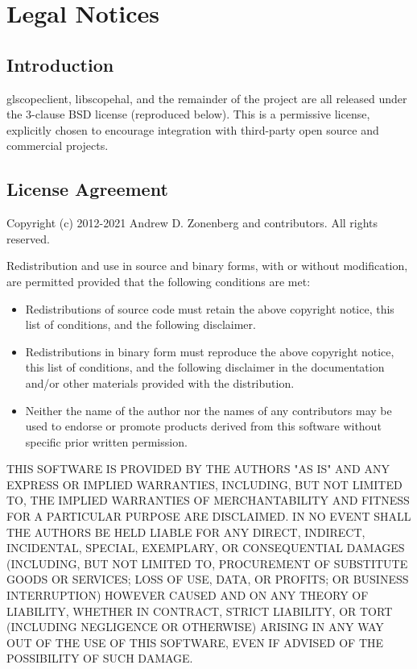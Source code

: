 \chapter{Legal Notices}

\section{Introduction}

glscopeclient, libscopehal, and the remainder of the project are all released under the 3-clause BSD license
(reproduced below). This is a permissive license, explicitly chosen to encourage integration with third-party open
source and commercial projects.

\section{License Agreement}

Copyright (c) 2012-2021 Andrew D. Zonenberg and contributors.
All rights reserved.

Redistribution and use in source and binary forms, with or without modification, are permitted provided that the
following conditions are met:
\begin{itemize}
\item Redistributions of source code must retain the above copyright notice, this list of conditions, and the
following disclaimer.
\item Redistributions in binary form must reproduce the above copyright notice, this list of conditions, and the
following disclaimer in the documentation and/or other materials provided with the distribution.
\item Neither the name of the author nor the names of any contributors may be used to endorse or promote products
derived from this software without specific prior written permission.
\end{itemize}

THIS SOFTWARE IS PROVIDED BY THE AUTHORS "AS IS" AND ANY EXPRESS OR IMPLIED WARRANTIES, INCLUDING, BUT NOT LIMITED
TO, THE IMPLIED WARRANTIES OF MERCHANTABILITY AND FITNESS FOR A PARTICULAR PURPOSE ARE DISCLAIMED. IN NO EVENT SHALL
THE AUTHORS BE HELD LIABLE FOR ANY DIRECT, INDIRECT, INCIDENTAL, SPECIAL, EXEMPLARY, OR CONSEQUENTIAL DAMAGES
(INCLUDING, BUT NOT LIMITED TO, PROCUREMENT OF SUBSTITUTE GOODS OR SERVICES; LOSS OF USE, DATA, OR PROFITS; OR
BUSINESS INTERRUPTION) HOWEVER CAUSED AND ON ANY THEORY OF LIABILITY, WHETHER IN CONTRACT, STRICT LIABILITY, OR TORT
(INCLUDING NEGLIGENCE OR OTHERWISE) ARISING IN ANY WAY OUT OF THE USE OF THIS SOFTWARE, EVEN IF ADVISED OF THE
POSSIBILITY OF SUCH DAMAGE.

